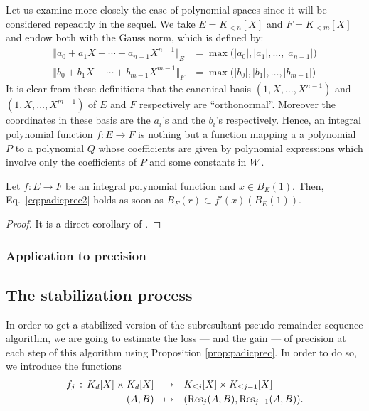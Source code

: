 \documentclass{article}
\begin{document}
\begin{ex}
Let us examine more closely the case of polynomial spaces since it will 
be considered repeadtly in the sequel. We take $E = K_{<n}[X]$ and $F = 
K_{<m}[X]$ and endow both with the Gauss norm, which is defined by:
\begin{align*}
\Vert a_0 + a_1 X + \cdots + a_{n-1} X^{n-1} \Vert_E & 
  = \max \big(|a_0|, |a_1|, \ldots, |a_{n-1}|\big) \\
\Vert b_0 + b_1 X + \cdots + b_{m-1} X^{m-1} \Vert_F & 
  = \max \big(|b_0|, |b_1|, \ldots, |b_{m-1}|\big)
\end{align*}
It is clear from these definitions that the canonical basis $(1, X, 
\ldots, X^{n-1})$ and $(1, X, \ldots, X^{m-1})$ of $E$ and $F$ 
respectively are ``orthonormal''. Moreover the coordinates in these
basis are the $a_i$'s and the $b_i$'s respectively. Hence, an integral
polynomial function $f : E \to F$ is nothing but a function mapping a
a polynomial $P$ to a polynomial $Q$ whose coefficients are given by
polynomial expressions which involve only the coefficients of $P$ and 
some constants in $W$.
\end{ex}

\begin{prop}
\label{prop:padicprec}
Let $f : E \to F$ be an integral polynomial function and $x \in B_E(1)$. 
Then, Eq.~\eqref{eq:padicprec2} holds as soon as 
$B_F(r) \subset f'(x)(B_E(1))$.
\end{prop}

\begin{proof}
It is a direct corollary of \cite[Proposition 3.12]{padicprec}.
\end{proof}

\subsubsection*{Application to precision}



\subsection{The stabilization process}
\label{subsec:stabilization}

In order to get a stabilized version of the subresultant 
pseudo-remainder sequence algorithm, we are going to estimate 
the loss --- and the gain --- of precision at each step of this 
algorithm using Proposition \ref{prop:padicprec}. In order to do
so, we introduce the functions
$$\begin{array}{rcl}
f_j \, : \, K_d[X] \times K_d[X] & \to & K_{\leq j}[X] \times 
K_{\leq j-1}[X] \smallskip \\
(A,B) & \mapsto & (\Res_j(A,B), \Res_{j-1}(A,B)).
\end{array}$$
\end{document}
